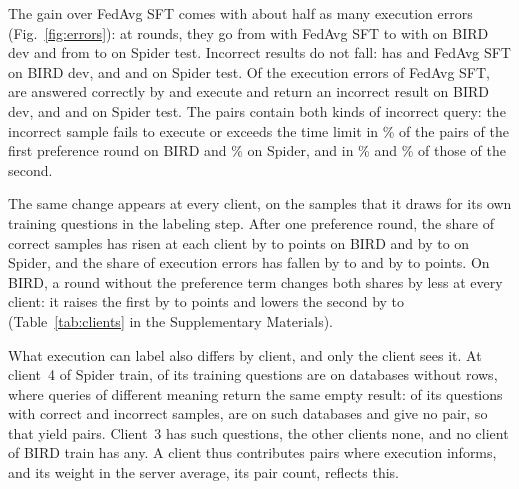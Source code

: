 The gain over FedAvg SFT comes with about half as many execution errors
(Fig.~\ref{fig:errors}): at  rounds, they go from
 with FedAvg SFT to  with
\method{} on BIRD dev and from  to
 on Spider test. Incorrect results do not fall:
\method{} has  and FedAvg SFT  on
BIRD dev, and  and  on Spider
test. Of
the execution errors of FedAvg SFT,  are
answered correctly by \method{} and 
execute and return an incorrect result on BIRD dev, and
 and  on
Spider test. The pairs contain both kinds of incorrect query: the
incorrect sample fails to execute or exceeds the time limit in
\% of the pairs of the first
preference round on BIRD and \%
on Spider, and in \% and
\% of those of the second.

The same change appears at every client, on the samples that it draws
for its own training questions in the labeling step. After one
preference round, the share of correct samples has risen at each client
by  to
 points on BIRD and by
 to
 on Spider, and the share of
execution errors has fallen by  to
 and by
 to
 points. On BIRD, a round without the
preference term changes both shares by less at every client: it raises
the first by  to
 points and lowers the second by
 to
(Table~\ref{tab:clients} in the Supplementary Materials).

What execution can label also differs by client, and only the client
sees it. At client~4 of Spider train,  of
its  training questions are on
databases without rows, where queries of different meaning return the
same empty result: of its  questions
with correct and incorrect samples, 
are on such databases and give no pair, so that
 yield pairs. Client~3 has
 such questions, the other
 clients none, and no client of BIRD
train has any. A client thus contributes pairs where execution informs,
and its weight in the server average, its pair count, reflects this.

